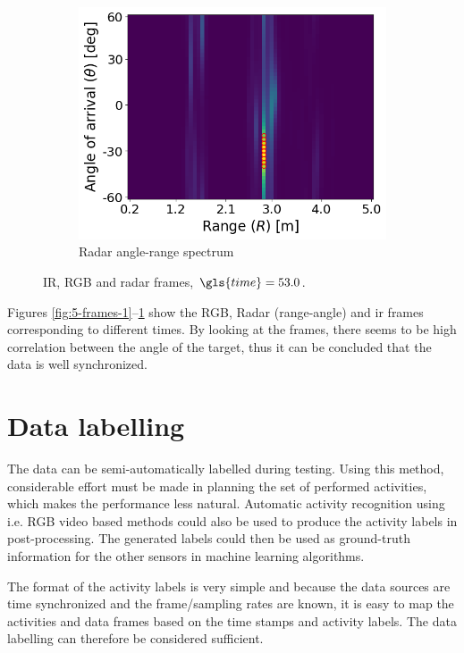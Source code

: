 \begin{figure}
\begin{subfigure}[t]{0.3\textwidth}
    \end{subfigure}
    \hfill
    \begin{subfigure}[t]{0.3\textwidth}
        \includegraphics[width=\textwidth]{fig/5/radar_t_53.0.png}
        \caption{Radar angle-range spectrum}
    \end{subfigure}
    \caption{IR, RGB and radar frames, $\gls{time} = 53.0$.}
    \label{fig:5-frames-3}
\end{figure}

Figures \ref{fig:5-frames-1}--\ref{fig:5-frames-3} show the RGB, Radar (range-angle) and \gls{ir} frames
corresponding to different times. By looking at the frames, there seems to be high correlation between
the angle of the target, thus it can be concluded that the data is well synchronized.

\section{Data labelling}
The data can be semi-automatically labelled during testing.
Using this method, considerable effort must be made in planning the set of performed activities,
which makes the performance less natural.
Automatic activity recognition using i.e. RGB video based methods could also be used to produce the activity labels
in post-processing.
The generated labels could then be used as ground-truth information for the other sensors in machine learning algorithms.

The format of the activity labels is very simple and because the data sources are time synchronized and the frame/sampling rates are known,
it is easy to map the activities and data frames based on the time stamps and activity labels.
The data labelling can therefore be considered sufficient.

